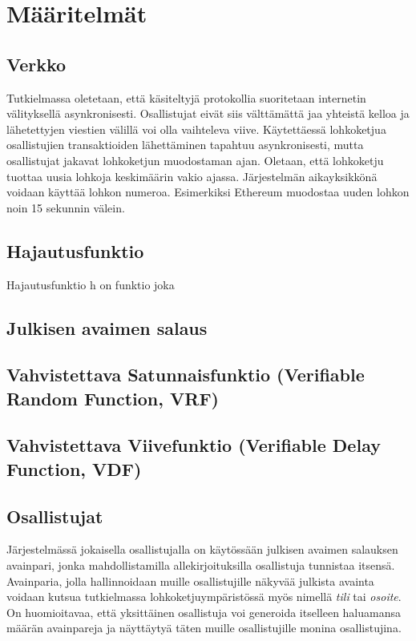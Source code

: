 \chapter{Määritelmät\label{methods}}

\section{Verkko}
Tutkielmassa oletetaan, että käsiteltyjä protokollia suoritetaan internetin välityksellä asynkronisesti. Osallistujat eivät siis välttämättä jaa yhteistä kelloa ja lähetettyjen viestien välillä voi olla vaihteleva viive. Käytettäessä lohkoketjua osallistujien transaktioiden lähettäminen tapahtuu asynkronisesti, mutta osallistujat jakavat lohkoketjun muodostaman ajan. Oletaan, että lohkoketju tuottaa uusia lohkoja keskimäärin vakio ajassa. Järjestelmän aikayksikkönä voidaan käyttää lohkon numeroa. Esimerkiksi Ethereum muodostaa uuden lohkon noin 15 sekunnin välein.

\section{Hajautusfunktio}
Hajautusfunktio h on funktio joka

\section{Julkisen avaimen salaus}

\section{Vahvistettava Satunnaisfunktio (Verifiable Random Function, VRF)}

\section{Vahvistettava Viivefunktio (Verifiable Delay Function, VDF)}

\section{Osallistujat}
Järjestelmässä jokaisella osallistujalla on käytössään julkisen avaimen salauksen avainpari, jonka mahdollistamilla allekirjoituksilla osallistuja tunnistaa itsensä. Avainparia, jolla hallinnoidaan muille osallistujille näkyvää julkista avainta voidaan kutsua tutkielmassa lohkoketjuympäristössä myös nimellä \textit{tili} tai \textit{osoite}. On huomioitavaa, että yksittäinen osallistuja voi generoida itselleen haluamansa määrän avainpareja ja näyttäytyä täten muille osallistujille monina osallistujina.

